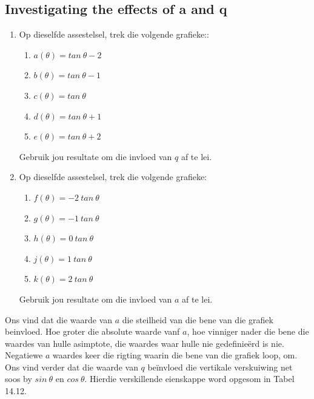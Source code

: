\subsection*{Investigating the effects of a and q}
\nopagebreak
\begin{enumerate}[noitemsep, label=\textbf{\arabic*}. ] 
\item Op dieselfde assestelsel, trek die volgende grafieke::
\begin{enumerate}[noitemsep, label=\textbf{\alph*}. ] 
\item $a(\theta )=tan~\theta -2$
\item $b(\theta )=tan~\theta -1$
\item $c(\theta )=tan~\theta $
\item $d(\theta )=tan~\theta +1$
\item $e(\theta )=tan~\theta +2$\end{enumerate}
Gebruik jou resultate om die invloed van $q$ af te lei.
\item Op dieselfde assestelsel, trek die volgende grafieke:
\begin{enumerate}[noitemsep, label=\textbf{\alph*}. ] 
\item $f(\theta )=-2~tan~\theta $
\item $g(\theta )=-1~tan~\theta $
\item $h(\theta )=0~tan~\theta $
\item $j(\theta )=1~tan~\theta $
\item $k(\theta )=2~tan~\theta $\end{enumerate}
Gebruik jou resultate om die invloed van $a$ af te lei.
\end{enumerate}
Ons vind dat die waarde van $a$ die steilheid van die bene van die grafiek beinvloed. Hoe groter die absolute waarde vanf $a$, hoe vinniger nader die bene die waardes van hulle asimptote, die waardes waar hulle nie gedefinieërd is nie. Negatiewe $a$ waardes keer die rigting waarin die bene van die grafiek loop, om. Ons vind
verder dat die waarde van $q$ beïnvloed die vertikale verskuiwing net soos by $sin~\theta $ en $cos~\theta $.
Hierdie verskillende eienskappe word opgesom in Tabel 14.12.\par 
